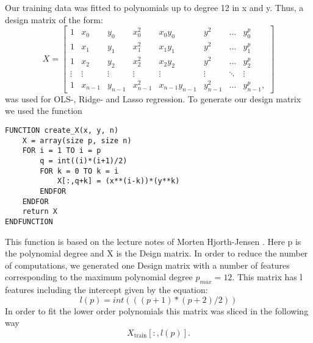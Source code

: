Our training data was fitted to polynomials up
to degree 12 in x and y. Thus, a design matrix of the form:
\begin{equation*}
    X = 
    \begin{bmatrix}

        1 & x_{0} & y_0 & x_{0}^{2} & x_0 y_0 & y^2 & \dots &y_{0}^{p} \\
        1 & x_{1} & y_1 & x_{1}^{2} & x_1 y_1 & y^2 & \dots &y_{1}^{p} \\
        1 & x_{2} & y_2 & x_{2}^{2} & x_2 y_2 & y^2 & \dots &y_{2}^{p} \\
        \vdots &\vdots &\vdots &\vdots &\vdots & \vdots & \ddots & \vdots \\
        1&x_{n-1} & y_{n-1} & x_{n-1}^2 & x_{n-1} y_{n-1} & y_{n-1}^2 & \dots &y_{n-1}^{p}, 
    \end{bmatrix}
\end{equation*}
was used for OLS-, Ridge- and Lasso regression. To generate our design matrix we used the function
\begin{lstlisting}
FUNCTION create_X(x, y, n)
	X = array(size p, size n)
	FOR i = 1 TO i = p
		q = int((i)*(i+1)/2)
		FOR k = 0 TO k = i
			X[:,q+k] = (x**(i-k))*(y**k)
		ENDFOR
	ENDFOR
	return X
ENDFUNCTION
\end{lstlisting}
This function is based on the lecture notes of Morten Hjorth-Jensen \cite{w35}.
Here p is the polynomial degree and X is the Deign matrix. 
In order to reduce the number of computations, we generated one Design matrix
with a number of features corresponding to the maximum polynomial degree $p_{max}
= 12$. This matrix has l features including the intercept given by the
equation: 
\begin{equation*}
        l(p) = int(((p+1)*(p+2)/2))		
\end{equation*}
In order to fit the lower order polynomials this matrix was sliced in the
following way
\begin{equation*}
    X_{\text{train}}[:,l(p)].
\end{equation*}

  




